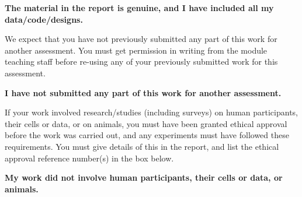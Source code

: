\textbf{The material in the report is genuine, and I have included all my data/code/designs.}

We expect that you have not previously submitted any part of this work for another assessment. You must get permission in writing from the module teaching staff before re-using any of your previously submitted work for this assessment.

\textbf{I have not submitted any part of this work for another assessment.}

If your work involved research/studies (including surveys) on human participants, their cells or data, or on animals, you must have been granted ethical approval before the work was carried out, and any experiments must have followed these requirements. You must give details of this in the report, and list the ethical approval reference number(s) in the box below.

\textbf{My work did not involve human participants, their cells or data, or animals.}

